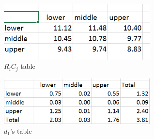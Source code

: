 \documentclass[12pt]{article}
\begin{document}
\begin{figure}[h!]
\centering
  \includegraphics[width=8cm]{10-5-6-a.png}
  \caption{$R_iC_j$ table}
  \label{fig:boat1}
\end{figure}


\begin{figure}[h!]
\centering
  \includegraphics[width=8cm]{10-5-6-b.png}
  \caption{$d_1$'s table}
  \label{fig:boat1}
\end{figure}
\end{document}

